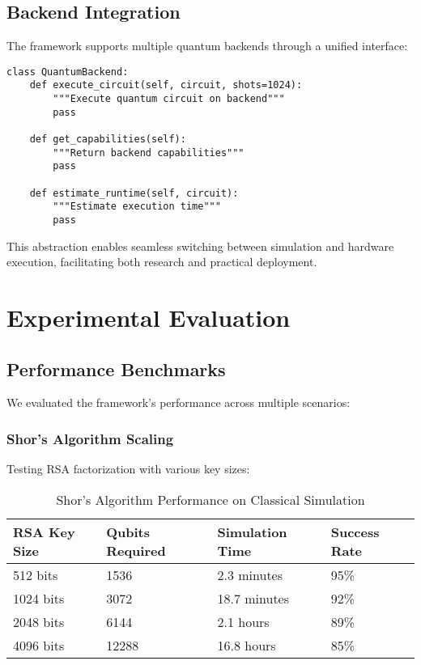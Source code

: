 \documentclass[11pt]{article}
\begin{document}
\subsection{Backend Integration}

The framework supports multiple quantum backends through a unified interface:

\begin{verbatim}
class QuantumBackend:
    def execute_circuit(self, circuit, shots=1024):
        """Execute quantum circuit on backend"""
        pass
    
    def get_capabilities(self):
        """Return backend capabilities"""
        pass
    
    def estimate_runtime(self, circuit):
        """Estimate execution time"""
        pass
\end{verbatim}

This abstraction enables seamless switching between simulation and hardware execution, facilitating both research and practical deployment.

\section{Experimental Evaluation}

\subsection{Performance Benchmarks}

We evaluated the framework's performance across multiple scenarios:

\subsubsection{Shor's Algorithm Scaling}

Testing RSA factorization with various key sizes:

\begin{table}[h]
\centering
\begin{tabular}{@{}llll@{}}
\toprule
RSA Key Size & Qubits Required & Simulation Time & Success Rate \\
\midrule
512 bits & 1536 & 2.3 minutes & 95\% \\
1024 bits & 3072 & 18.7 minutes & 92\% \\
2048 bits & 6144 & 2.1 hours & 89\% \\
4096 bits & 12288 & 16.8 hours & 85\% \\
\bottomrule
\end{tabular}
\caption{Shor's Algorithm Performance on Classical Simulation}
\label{tab:shor_performance}
\end{table}
\end{document}

